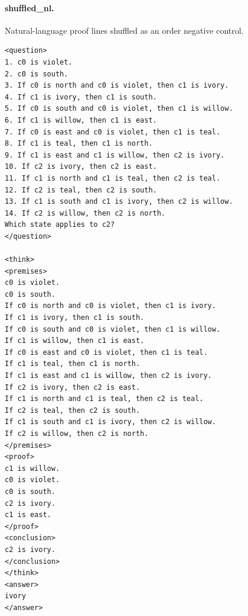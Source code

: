 \documentclass[10pt]{article}
\begin{document}
\paragraph{shuffled\_nl.} Natural-language proof lines shuffled as an order negative control.
\begin{verbatim}
<question>
1. c0 is violet.
2. c0 is south.
3. If c0 is north and c0 is violet, then c1 is ivory.
4. If c1 is ivory, then c1 is south.
5. If c0 is south and c0 is violet, then c1 is willow.
6. If c1 is willow, then c1 is east.
7. If c0 is east and c0 is violet, then c1 is teal.
8. If c1 is teal, then c1 is north.
9. If c1 is east and c1 is willow, then c2 is ivory.
10. If c2 is ivory, then c2 is east.
11. If c1 is north and c1 is teal, then c2 is teal.
12. If c2 is teal, then c2 is south.
13. If c1 is south and c1 is ivory, then c2 is willow.
14. If c2 is willow, then c2 is north.
Which state applies to c2?
</question>

<think>
<premises>
c0 is violet.
c0 is south.
If c0 is north and c0 is violet, then c1 is ivory.
If c1 is ivory, then c1 is south.
If c0 is south and c0 is violet, then c1 is willow.
If c1 is willow, then c1 is east.
If c0 is east and c0 is violet, then c1 is teal.
If c1 is teal, then c1 is north.
If c1 is east and c1 is willow, then c2 is ivory.
If c2 is ivory, then c2 is east.
If c1 is north and c1 is teal, then c2 is teal.
If c2 is teal, then c2 is south.
If c1 is south and c1 is ivory, then c2 is willow.
If c2 is willow, then c2 is north.
</premises>
<proof>
c1 is willow.
c0 is violet.
c0 is south.
c2 is ivory.
c1 is east.
</proof>
<conclusion>
c2 is ivory.
</conclusion>
</think>
<answer>
ivory
</answer>
\end{verbatim}
\end{document}

